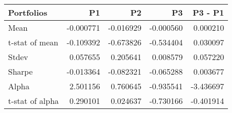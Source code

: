 \begin{tabular}{lrrrr}
\toprule
Portfolios & P1 & P2 & P3 & P3 - P1 \\
\midrule
Mean & -0.000771 & -0.016929 & -0.000560 & 0.000210 \\
t-stat of mean & -0.109392 & -0.673826 & -0.534404 & 0.030097 \\
Stdev & 0.057655 & 0.205641 & 0.008579 & 0.057220 \\
Sharpe & -0.013364 & -0.082321 & -0.065288 & 0.003677 \\
Alpha & 2.501156 & 0.760645 & -0.935541 & -3.436697 \\
t-stat of alpha & 0.290101 & 0.024637 & -0.730166 & -0.401914 \\
\bottomrule
\end{tabular}
